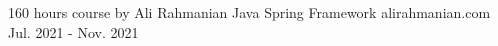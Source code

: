 
\begin{cventries}

  \cventry
    {160 hours course by Ali Rahmanian} %
    {Java Spring Framework} %
    {alirahmanian.com} %
    {Jul. 2021 - Nov. 2021} %
    { %
    }
    
  \vspace{-4mm}
\end{cventries}
